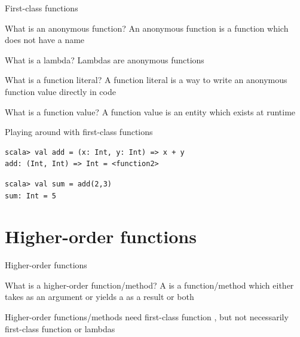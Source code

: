 
\begin{frame}{First-class functions}
\begin{block}{What is an anonymous function?}
\pause
An anonymous function is a function which does not have a name
\end{block}
\pause
\begin{block}{What is a lambda?}
\pause
Lambdas are anonymous functions
\end{block}
\pause
\begin{block}{What is a function literal?}
\pause
A function literal is a way to write an anonymous function value directly in
code
\end{block}
\pause
\begin{block}{What is a function value?}
\pause
A function value is an entity which exists at runtime
\end{block}
\end{frame}

\begin{frame}[fragile]{Playing around with first-class functions}
\begin{lstlisting}
scala> val add = (x: Int, y: Int) => x + y
add: (Int, Int) => Int = <function2>

\end{lstlisting}
\pause
\begin{lstlisting}
scala> val sum = add(2,3)
sum: Int = 5
\end{lstlisting}
\end{frame}

\section{Higher-order functions}
\begin{frame}{Higher-order functions}
\begin{block}{What is a higher-order function/method?}
\pause
A  is a function/method which either
takes  as an argument or yields a
 as a result or both
\end{block}
\pause
\begin{center}
Higher-order functions/methods need first-class function , but
not necessarily first-class function  or lambdas
\end{center}
\end{frame}

